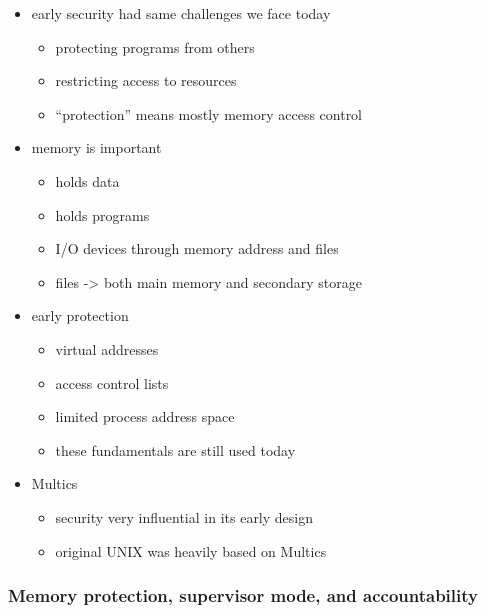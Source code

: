 \documentclass[
  12pt]{findlay}
\providecommand{\tightlist}{%
  \setlength{\itemsep}{0pt}\setlength{\parskip}{0pt}}
\begin{document}
\begin{itemize}
\tightlist
\item
  early security had same challenges we face today

  \begin{itemize}
  \tightlist
  \item
    protecting programs from others
  \item
    restricting access to resources
  \item
    ``protection'' means mostly memory access control
  \end{itemize}
\item
  memory is important

  \begin{itemize}
  \tightlist
  \item
    holds data
  \item
    holds programs
  \item
    I/O devices through memory address and files
  \item
    files -\textgreater{} both main memory and secondary storage
  \end{itemize}
\item
  early protection

  \begin{itemize}
  \tightlist
  \item
    virtual addresses
  \item
    access control lists
  \item
    limited process address space
  \item
    these fundamentals are still used today
  \end{itemize}
\item
  Multics

  \begin{itemize}
  \tightlist
  \item
    security very influential in its early design
  \item
    original UNIX was heavily based on Multics
  \end{itemize}
\end{itemize}

\hypertarget{memory-protection-supervisor-mode-and-accountability}{%
\subsubsection{Memory protection, supervisor mode, and
accountability}\label{memory-protection-supervisor-mode-and-accountability}}
\end{document}
